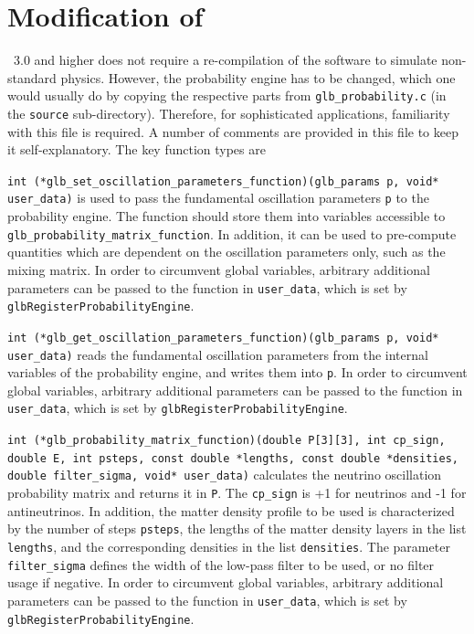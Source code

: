 \section{Modification of \GLOBES }

\GLOBES\ 3.0 and higher does not require a re-compilation of the software to simulate non-standard physics.
However, the probability engine has to be changed, which one would usually do by copying the respective parts from {\tt glb\_probability.c} (in the {\tt source} sub-directory). Therefore, for sophisticated applications, familiarity with this file is required. A number of comments are provided in this file to keep it self-explanatory.
The key function types are
\begin{function}
{\tt int (*glb\_set\_oscillation\_parameters\_function)(glb\_params p, void* user\_data)} is
used to pass the fundamental oscillation parameters {\tt p} to the probability engine.
The function should store them into variables accessible to {\tt glb\_probability\_matrix\_function}.
In addition, it can be used to pre-compute quantities which are dependent on the oscillation parameters only, such
as the mixing matrix. 
In order to circumvent global variables, arbitrary additional parameters can be
passed to the function in {\tt user\_data}, which is set by {\tt glbRegisterProbabilityEngine}.
\end{function}
\begin{function}
{\tt int (*glb\_get\_oscillation\_parameters\_function)(glb\_params p, void* user\_data)}
reads the fundamental oscillation parameters from the internal variables of the probability
engine, and writes them into {\tt p}.
In order to circumvent global variables, arbitrary additional parameters can be
passed to the function in {\tt user\_data}, which is set by {\tt glbRegisterProbabilityEngine}.
\end{function}
\begin{function}
{\tt int (*glb\_probability\_matrix\_function)(double P[3][3], int cp\_sign, double E,
                  int psteps, const double *lengths, const double *densities,
                  double filter\_sigma, void* user\_data)}
calculates the neutrino oscillation probability matrix and returns it in {\tt P}.
The {\tt cp\_sign} is +1 for neutrinos and -1 for antineutrinos. In addition, the matter
density profile to be used is characterized by the number of steps {\tt psteps}, the
lengths of the matter density layers in the list {\tt lengths}, and the corresponding
densities in the list {\tt densities}. The parameter {\tt filter\_sigma} defines
the width of the low-pass filter to be used, or no filter usage if negative.
In order to circumvent global variables, arbitrary additional parameters can be
passed to the function in {\tt user\_data}, which is set by {\tt glbRegisterProbabilityEngine}.
\end{function}
